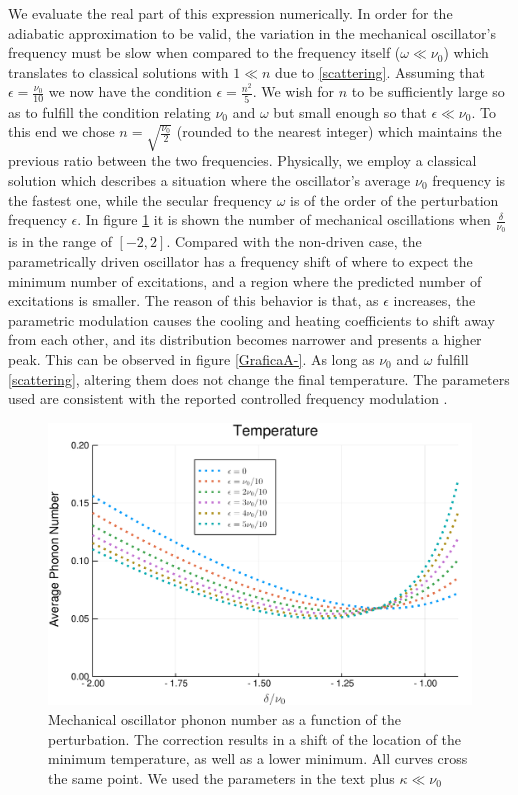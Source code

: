 \documentclass[reprint, amsmath,amssymb, aps,pra]{revtex4-1}
\begin{document}
We evaluate the real part of this expression numerically. In order for
the adiabatic approximation to be valid, the variation in the
mechanical oscillator's frequency must be slow when compared to the
frequency itself ($\omega \ll \nu_0$) which translates to classical
solutions with $1 \ll n$ due to \eqref{scattering}. Assuming that
$\epsilon = \frac{\nu_0}{10}$ we now have the condition
$\epsilon = \frac{n^2}{5}$. We wish for $n$ to be sufficiently large
so as to fulfill the condition relating $\nu_0$ and $\omega$ but small
enough so that $\epsilon \ll \nu_0$. To this end we chose
$n=\sqrt{\frac{\nu_0}{2}}$ (rounded to the nearest integer) which
maintains the previous ratio between the two frequencies. Physically,
we employ a classical solution which describes a situation where the
oscillator's average $\nu_0$ frequency is the fastest one, while the
secular frequency $\omega$ is of the order of the perturbation
frequency $\epsilon$. In figure \ref{GraficaTemp} it is shown the
number of mechanical oscillations when $\frac{\delta}{\nu_0}$ is in
the range of $[-2,2]$. Compared with the non-driven case, the
parametrically driven oscillator has a frequency shift of where to
expect the minimum number of excitations, and a region where the
predicted number of excitations is smaller. The reason of this
behavior is that, as $\epsilon$ increases, the parametric modulation
causes the cooling and heating coefficients to shift away from each
other, and its distribution becomes narrower and presents a higher
peak. This can be observed in figure \ref{GraficaA-}. As long as
$\nu_0$ and $\omega$ fulfill \eqref{scattering}, altering them does
not change the final temperature. The parameters used are consistent
with the reported controlled frequency modulation
\cite{WoolleyNM}\cite{JockelS}.



\begin{figure}
\includegraphics[scale=.4]{Temperature.pdf}  
\caption{ Mechanical oscillator phonon number as a function of the
  perturbation. The correction results in a shift of the location of
  the minimum temperature, as well as a lower minimum. All curves
  cross the same point. We used the parameters in the text plus
  $\kappa \ll \nu_0$}
\label{GraficaTemp}
\end{figure}
\end{document}
